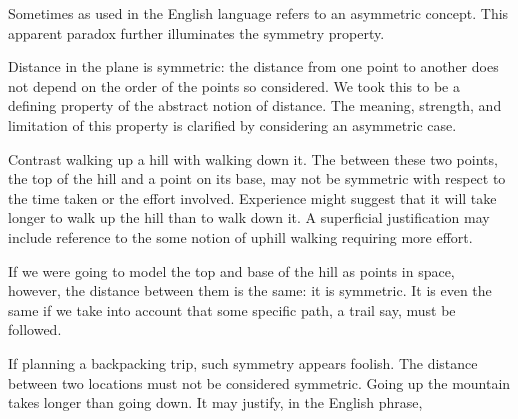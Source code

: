 
\sbasic



\sstart



Sometimes 
as used in the English language
refers to an asymmetric  concept.
This apparent paradox further
illuminates the symmetry property.


Distance in the plane is
symmetric: the distance from
one point to another does
not depend on the order of the
points so considered.
We took this to be a defining
property of the abstract notion
of distance.
The meaning, strength, and
limitation of
this property
is clarified by considering an
asymmetric case.

Contrast walking up a hill
with walking down it.
The  between these
two points, the top of the hill
and a point on its base,
may not be symmetric with respect to
the time taken or the effort involved.
Experience might suggest
that it will take longer
to walk up the hill
than to walk down it.
A superficial justification may
include reference to the some
notion of uphill walking requiring
more effort.

If we were going to model the top and
base of the hill
as points in space, however, the
distance between them is the same: it
is symmetric.
It is even the same if we take into
account that some specific path, a trail
say, must be followed.

If planning a backpacking trip,
such symmetry appears foolish.
The distance between two
locations must not be considered
symmetric.
Going up the mountain takes longer
than going down.
It may justify, in the English
phrase, 


\strats
